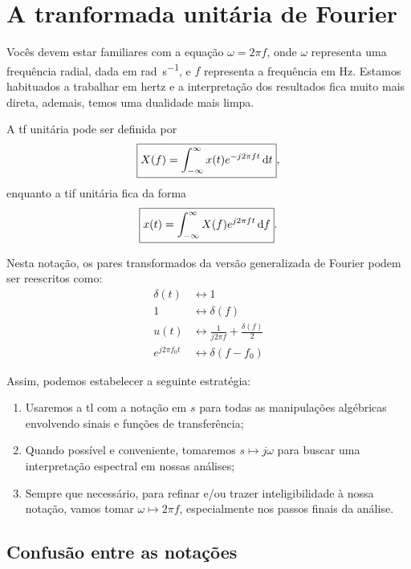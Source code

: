 \section{A tranformada unitária de Fourier}

Vocês devem estar familiares com a equação $\omega=2\pi f$, onde $\omega$ representa uma frequência radial, dada em \unit{\radian\per\second}, e $f$ representa a frequência em \unit{\hertz}. Estamos habituados a trabalhar em hertz e a interpretação dos resultados fica muito mais direta, ademais, temos uma dualidade mais limpa.

A \ac{tf} unitária pode ser definida por
\begin{equation}\label{eq:tf}
	\boxed{X(f)=\inte{x(t)e^{-j2\pi ft}}{t}{-\infty}{\infty}},
\end{equation}
enquanto a \ac{tif} unitária fica da forma
\begin{equation}\label{eq:tif}
	\boxed{x(t)=\inte{X(f)e^{j2\pi ft}}{f}{-\infty}{\infty}}.
\end{equation}

Nesta notação, os pares transformados da versão generalizada de Fourier podem ser reescritos como:
\begin{align}
	\delta(t)&\longleftrightarrow1\\
	1&\longleftrightarrow\delta(f)\\
	u(t)&\longleftrightarrow\frac{1}{j2\pi f}+\frac{\delta(f)}{2}\\
	e^{j2\pi f_0t}&\longleftrightarrow\delta(f-f_0)
\end{align}

Assim, podemos estabelecer a seguinte estratégia:
\begin{enumerate}
	\item Usaremos a \ac{tl} com a notação em $s$ para todas as manipulações algébricas envolvendo sinais e funções de transferência;
	\item Quando possível e conveniente, tomaremos $s\mapsto j\omega$ para buscar uma interpretação espectral em nossas análises;
	\item Sempre que necessário, para refinar e\slash ou trazer inteligibilidade à nossa notação, vamos tomar $\omega\mapsto2\pi f$, especialmente nos passos finais da análise.
\end{enumerate}

\subsection{Confusão entre as notações}

